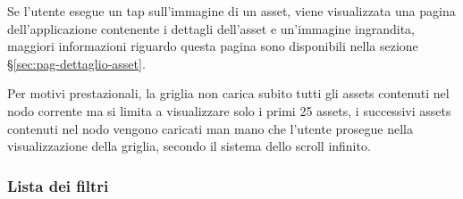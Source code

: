 Se l'utente esegue un \gls{tap} sull'immagine di un asset, viene visualizzata una pagina dell'applicazione contenente i dettagli dell'asset e un'immagine ingrandita, maggiori informazioni riguardo questa pagina sono disponibili nella sezione §\ref{sec:pag-dettaglio-asset}.

Per motivi prestazionali, la griglia non carica subito tutti gli assets contenuti nel nodo corrente ma si limita a visualizzare solo i primi 25 assets, i successivi assets contenuti nel nodo vengono caricati man mano che l'utente prosegue nella visualizzazione della griglia, secondo il sistema dello scroll infinito.

\FloatBarrier
\subsubsection{Lista dei filtri}

